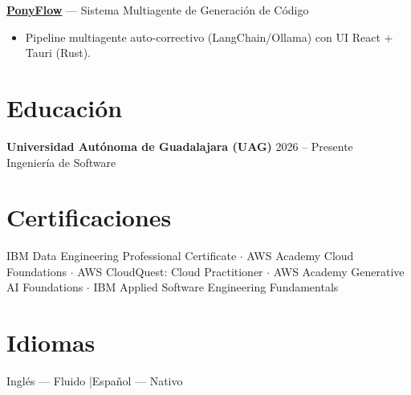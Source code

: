\documentclass[10pt,a4paper]{article}
\begin{document}
\textbf{\href{https://github.com/Emilio-Gordillo-Esparragoza/PonyFlow}{PonyFlow}} --- Sistema Multiagente de Generaci\'on de C\'odigo\\
\begin{itemize}
    \item Pipeline multiagente auto-correctivo (LangChain/Ollama) con UI React + Tauri (Rust).
\end{itemize}

\section*{Educaci\'on}
\textbf{Universidad Aut\'onoma de Guadalajara (UAG)} \hfill 2026 -- Presente\\
Ingenier\'ia de Software

\section*{Certificaciones}
IBM Data Engineering Professional Certificate $\cdot$
AWS Academy Cloud Foundations $\cdot$
AWS CloudQuest: Cloud Practitioner $\cdot$
AWS Academy Generative AI Foundations $\cdot$
IBM Applied Software Engineering Fundamentals

\section*{Idiomas}
Ingl\'es --- Fluido \quad|\quad Espa\~nol --- Nativo
\end{document}
